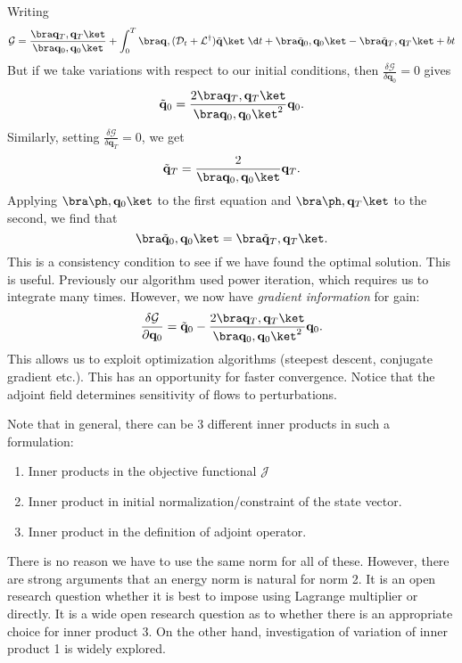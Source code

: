 \documentclass[a4paper]{article}
\begin{document}
Writing
\[
  \mathcal{G} = \frac{\bra \mathbf{q}_T, \mathbf{q}_T\ket}{\bra \mathbf{q}_0, \mathbf{q}_0\ket} + \int_0^T \bra \mathbf{q}, (\mathcal{D}_t + \mathcal{L}^\dagger) \tilde{\mathbf{q}}\ket \;\d t + \bra \tilde{\mathbf{q}}_0, \mathbf{q}_0\ket - \bra \tilde{\mathbf{q}}_T, \mathbf{q}_T\ket + bt
\]
But if we take variations with respect to our initial conditions, then $\frac{\delta \mathcal{G}}{\delta \mathbf{q}_0} = 0$ gives
\[
  \tilde{\mathbf{q}}_0 = \frac{2 \bra \mathbf{q}_T, \mathbf{q}_T\ket}{\bra \mathbf{q}_0, \mathbf{q}_0\ket^2} \mathbf{q}_0.
\]
Similarly, setting $\frac{\delta \mathcal{G}}{\delta \mathbf{q}_T} = 0$, we get
\[
  \tilde{\mathbf{q}}_T = \frac{2}{\bra \mathbf{q}_0, \mathbf{q}_0\ket }\mathbf{q}_T.
\]
Applying $\bra \ph, \mathbf{q}_0\ket$ to the first equation and $\bra \ph, \mathbf{q}_T\ket$ to the second, we find that
\[
  \bra \tilde{\mathbf{q}}_0, \mathbf{q}_0\ket = \bra \tilde{\mathbf{q}}_T, \mathbf{q}_T\ket.
\]
This is a consistency condition to see if we have found the optimal solution. This is useful. Previously our algorithm used power iteration, which requires us to integrate many times. However, we now have \emph{gradient information} for gain:
\[
  \frac{\delta \mathcal{G}}{\partial \mathbf{q}_0} = \tilde{\mathbf{q}}_0 - \frac{2 \bra \mathbf{q}_T, \mathbf{q}_T\ket}{\bra \mathbf{q}_0, \mathbf{q}_0\ket^2}\mathbf{q}_0.
\]
This allows us to exploit optimization algorithms (steepest descent, conjugate gradient etc.). This has an opportunity for faster convergence. Notice that the adjoint field determines sensitivity of flows to perturbations.

Note that in general, there can be 3 different inner products in such a formulation:
\begin{enumerate}
  \item Inner products in the objective functional $\mathcal{J}$
  \item Inner product in initial normalization/constraint of the state vector.
  \item Inner product in the definition of adjoint operator.
\end{enumerate}
There is no reason we have to use the same norm for all of these. However, there are strong arguments that an energy norm is natural for norm 2. It is an open research question whether it is best to impose using Lagrange multiplier or directly. It is a wide open research question as to whether there is an appropriate choice for inner product 3. On the other hand, investigation of variation of inner product 1 is widely explored.
\end{document}
